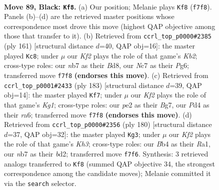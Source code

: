 \documentclass[11pt]{article}
\begin{document}
\clearpage

\begin{figure}[p]\centering
\begin{subfigure}{0.46\textwidth}\centering
\resizebox{\linewidth}{!}{%
\newchessgame
\chessboard[
  setfen={8/1Nn2k2/8/p7/Pb1pP2n/1P1B3p/4P3/2K5 b - - 45 89},
  showmover=false,
  pgfstyle=straightmove, color=movearrow, markmove={f7-f8}
]}
\caption{}
\end{subfigure}\hfill
\begin{subfigure}{0.46\textwidth}\centering
\resizebox{\linewidth}{!}{%
\newchessgame
\chessboard[
  setfen={3b4/1k5p/6pP/1p1pPpP1/1P1P4/4B1K1/8/8 b - - 15 81},
  showmover=false,
  pgfstyle=straightmove, color=movearrow, markmove={b7-c8}
]}
\caption{}
\end{subfigure}
\\[4pt]
\begin{subfigure}{0.46\textwidth}\centering
\resizebox{\linewidth}{!}{%
\newchessgame
\chessboard[
  setfen={6k1/6b1/R5p1/5pPp/1r3P1P/4B3/5PK1/8 b - - 48 92},
  showmover=false,
  pgfstyle=straightmove, color=movearrow, markmove={g8-f7}
]}
\caption{}
\end{subfigure}\hfill
\begin{subfigure}{0.46\textwidth}\centering
\resizebox{\linewidth}{!}{%
\newchessgame
\chessboard[
  setfen={8/1p3p2/2b1p3/p1B1P2k/P4P2/7K/3b4/R7 w - - 4 91},
  showmover=false,
  pgfstyle=straightmove, color=movearrow, markmove={h3-g3}
]}
\caption{}
\end{subfigure}
\caption{\textbf{Move 89, Black: \texttt{Kf8}.} (a) Our position; Melanie plays \texttt{Kf8} (\texttt{f7f8}). Panels (b)--(d) are the retrieved master positions whose correspondence most drove this move (highest QAP objective among those that transfer to it). (b) Retrieved from \texttt{ccrl\_top\_p0000\#2385} (ply 161) [structural distance $d$=40, QAP obj=16]: the master played \texttt{Kc8}; under $\mu$ our \emph{Kf2} plays the role of that game's \emph{Kb2}; cross-type roles: our \emph{n}b7 as their \emph{B}d8, our \emph{N}c7 as their \emph{P}g6; transferred move \texttt{f7f8} \textbf{(endorses this move)}. (c) Retrieved from \texttt{ccrl\_top\_p0001\#2433} (ply 183) [structural distance $d$=39, QAP obj=14]: the master played \texttt{Kf7}; under $\mu$ our \emph{Kf2} plays the role of that game's \emph{Kg1}; cross-type roles: our \emph{p}e2 as their \emph{B}g7, our \emph{P}d4 as their \emph{r}a6; transferred move \texttt{f7f8} \textbf{(endorses this move)}. (d) Retrieved from \texttt{ccrl\_top\_p0000\#2356} (ply 180) [structural distance $d$=37, QAP obj=32]: the master played \texttt{Kg3}; under $\mu$ our \emph{Kf2} plays the role of that game's \emph{Kh3}; cross-type roles: our \emph{B}b4 as their \emph{R}a1, our \emph{n}b7 as their \emph{b}d2; transferred move \texttt{f7f6}. Synthesis: 3 retrieved analogs transferred to \texttt{Kf8} (summed QAP objective 34, the strongest correspondence among the candidate moves); Melanie committed it via the \texttt{search} selector.}
\label{fig:thought-m177}
\end{figure}
\end{document}
